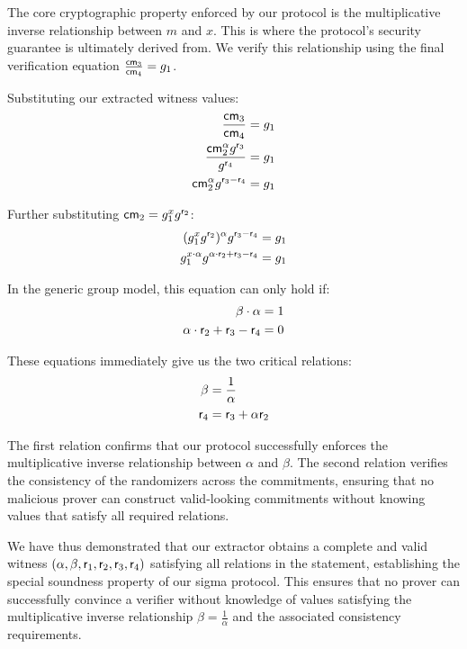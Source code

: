 \begin{enumerate}
    The core cryptographic property enforced by our protocol is the multiplicative inverse relationship between $m$ and $x$. This is where the protocol's security guarantee is ultimately derived from. We verify this relationship using the final verification equation $\frac{\mathsf{cm}_3}{\mathsf{cm}_4} = g_1$.
    
    Substituting our extracted witness values:
    \begin{align}
        \frac{\mathsf{cm}_3}{\mathsf{cm}_4} &= g_1 \\
        \frac{\mathsf{cm}_2^\alpha g^{\mathsf{r}_3}}{g^{\mathsf{r}_4}} &= g_1 \\
        \mathsf{cm}_2^\alpha g^{\mathsf{r}_3 - \mathsf{r}_4} &= g_1
    \end{align}
    
    Further substituting $\mathsf{cm}_2 = g_1^x g^{\mathsf{r}_2}$:
    \begin{align}
        (g_1^x g^{\mathsf{r}_2})^\alpha g^{\mathsf{r}_3 - \mathsf{r}_4} &= g_1 \\
        g_1^{x \cdot \alpha} g^{\alpha \cdot \mathsf{r}_2 + \mathsf{r}_3 - \mathsf{r}_4} &= g_1
    \end{align}
    
    In the generic group model, this equation can only hold if:
    \begin{align}
        \beta \cdot \alpha &= 1 \\
        \alpha \cdot \mathsf{r}_2 + \mathsf{r}_3 - \mathsf{r}_4 &= 0
    \end{align}
    
    These equations immediately give us the two critical relations:
    \begin{align}
        \beta &= \frac{1}{\alpha} \\
        \mathsf{r}_4 &= \mathsf{r}_3 + \alpha \mathsf{r}_2
    \end{align}
    
    The first relation confirms that our protocol successfully enforces the multiplicative inverse relationship between $\alpha$ and $\beta$. The second relation verifies the consistency of the randomizers across the commitments, ensuring that no malicious prover can construct valid-looking commitments without knowing values that satisfy all required relations.
\end{enumerate}

We have thus demonstrated that our extractor obtains a complete and valid witness $(\alpha, \beta, \mathsf{r}_1, \mathsf{r}_2, \mathsf{r}_3, \mathsf{r}_4)$ satisfying all relations in the statement, establishing the special soundness property of our sigma protocol. This ensures that no prover can successfully convince a verifier without knowledge of values satisfying the multiplicative inverse relationship $\beta = \frac{1}{\alpha}$ and the associated consistency requirements.

